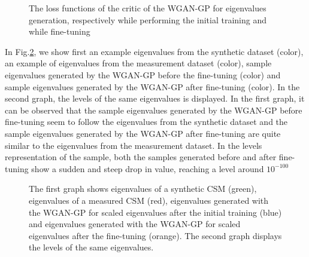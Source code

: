 \documentclass[11pt,a4paper,twoside]{report}
\begin{document}
\begin{figure}
    \centering
    \caption{The loss functions of the critic of the WGAN-GP for eigenvalues generation, respectively while performing the initial training and while fine-tuning}
    \label{fig:loss_evals_wgangp}
\end{figure}

In Fig.\ref{fig:samples_evals_wgangp}, we show first an example eigenvalues from the synthetic dataset (color), an example of eigenvalues from the measurement dataset (color), sample eigenvalues generated by the WGAN-GP before the fine-tuning (color) and sample eigenvalues generated by the WGAN-GP after fine-tuning (color). In the second graph, the levels of the same eigenvalues is displayed. In the first graph, it can be observed that the sample eigenvalues generated by the WGAN-GP before fine-tuning seem to follow the eigenvalues from the synthetic dataset and the sample eigenvalues generated by the WGAN-GP after fine-tuning are quite similar to the eigenvalues from the measurement dataset. In the levels representation of the sample, both the samples generated before and after fine-tuning show a sudden and steep drop in value, reaching a level around $10^{-100}$

\begin{figure}
    \centering
    \caption{The first graph shows eigenvalues of a synthetic CSM (green), eigenvalues of a measured CSM (red), eigenvalues generated with the WGAN-GP for scaled eigenvalues after the initial training (blue) and eigenvalues generated with the WGAN-GP for scaled eigenvalues after the fine-tuning (orange). The second graph displays the levels of the same eigenvalues.}
    \label{fig:samples_evals_wgangp}
\end{figure}
\end{document}
